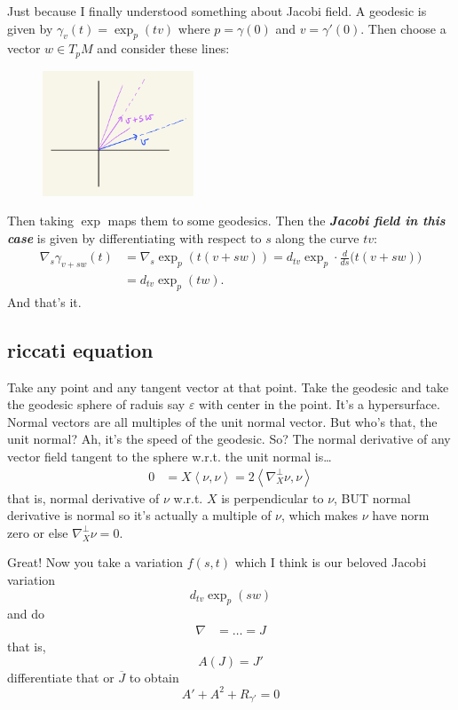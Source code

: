 Just because I finally understood something about Jacobi field. A geodesic is given by \(\gamma_v(t)=\operatorname{exp}_p(tv)\) where \(p=\gamma(0)\) and \(v=\gamma'(0)\). Then choose a vector \(w \in T_pM\) and consider these lines:
\begin{figure}[H]
	\centering
	\includegraphics[width=0.4\textwidth]{fig2}
\end{figure}
Then taking \(\operatorname{exp}\) maps them to some geodesics. Then the \textit{\textbf{Jacobi field in this case}} is given by differentiating with respect to \(s\) along the curve \(tv\):
\begin{align*}\nabla_s \gamma_{v+sw}(t)&=\nabla_s \operatorname{exp}_p(t(v+sw))=d_{tv}\operatorname{exp}_p\cdot \frac{d}{ds}\Big(t(v+sw)\Big)\\&=d_{tv}\operatorname{exp}_p(tw).\end{align*}
And that's it.

\subsection{riccati equation}

Take any point and any tangent vector at that point. Take the geodesic and take the geodesic sphere of raduis say \(\varepsilon\) with center in the point. It's a hypersurface. Normal vectors are all multiples of the unit normal vector. But who's that, the unit normal? Ah, it's the speed of the geodesic. So? The normal derivative of any vector field tangent to the sphere w.r.t. the unit normal is…
\begin{align*}
0&=X\left<\nu,\nu\right>=2\left<\nabla^\perp_X \nu,\nu\right>
\end{align*}
that is, normal derivative of \(\nu\) w.r.t. \(X\) is perpendicular to \(\nu\), BUT normal derivative is normal so it's actually a multiple of \(\nu\), which makes \(\nu\) have norm zero or else \(\nabla^\perp_X \nu=0\).

Great! Now you take a variation \(f(s,t)\) which I think is our beloved Jacobi variation
\[d_{tv}\operatorname{exp}_p(sw)\]
and do
\begin{align*}
\nabla &= \ldots=J
\end{align*}
that is,
\[A(J)=J'\]
differentiate that or \(\overline{J}\) to obtain
\[A'+A^2+R_{\gamma'}=0\]


